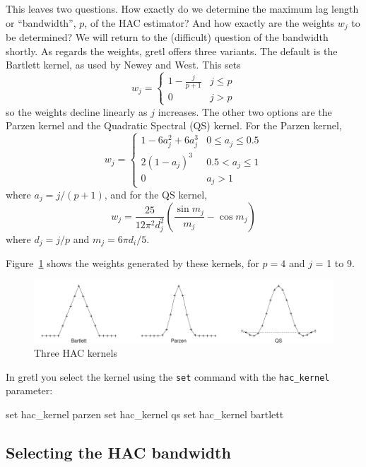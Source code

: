 This leaves two questions.  How exactly do we determine the maximum
lag length or ``bandwidth'', $p$, of the HAC estimator?  And how
exactly are the weights $w_j$ to be determined?  We will return to the
(difficult) question of the bandwidth shortly.  As regards the
weights, gretl offers three variants.  The default is the
Bartlett kernel, as used by Newey and West.  This sets
\[
w_j = \left\{ \begin{array}{cc}
     1 - \frac{j}{p+1} & j \leq p \\
     0 & j > p
     \end{array}
    \right.
\]
so the weights decline linearly as $j$ increases.  The other two
options are the Parzen kernel and the Quadratic Spectral (QS) kernel.
For the Parzen kernel,
\[
w_j = \left\{ \begin{array}{cc}
    1 - 6a_j^2 + 6a_j^3 & 0 \leq a_j \leq 0.5 \\
    2(1 - a_j)^3 & 0.5 < a_j \leq 1 \\
    0 & a_j > 1
    \end{array}
    \right.
\]
where $a_j = j/(p+1)$, and for the QS kernel,
\[
w_j = \frac{25}{12\pi^2 d_j^2} 
   \left(\frac{\sin{m_j}}{m_j} - \cos{m_j} \right)
\]
where $d_j = j/p$ and $m_j = 6\pi d_i/5$.  

Figure~\ref{fig:kernels} shows the weights generated by these kernels,
for $p=4$ and $j$ = 1 to 9.

\begin{figure}[htbp]
\caption{Three HAC kernels}
\label{fig:kernels}
\centering
\includegraphics{figures/kernels}
\end{figure}

In gretl you select the kernel using the \texttt{set} command
with the \verb|hac_kernel| parameter:
%
\begin{code}
set hac_kernel parzen
set hac_kernel qs
set hac_kernel bartlett
\end{code}

\subsection{Selecting the HAC bandwidth}
\label{sec:hac-bw}

